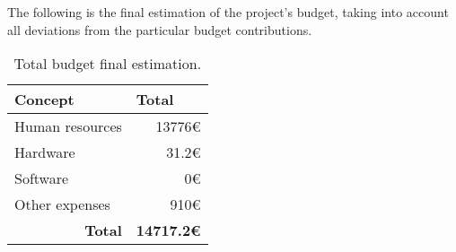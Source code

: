 The following is the final estimation of the project's budget, taking into account all deviations from the particular budget contributions.

\begin{table}[h]
	\centering
	\begin{tabular}{lr}
		\hline
		\textbf{Concept} & \multicolumn{1}{l}{\textbf{Total}} \\ \hline
		Human resources & 13776€ \\
		Hardware & 31.2€ \\
		Software & 0€ \\
		Other expenses & 910€ \\ \hline
		\multicolumn{1}{r}{\textbf{Total}} & \multicolumn{1}{l}{\textbf{14717.2€}}
	\end{tabular}
	\caption[Final estimation: total budget.]{Total budget final estimation.}
	\label{table:final-total-resources}
\end{table}